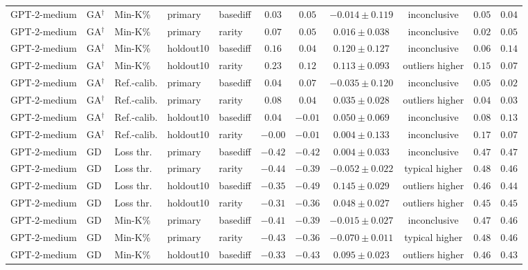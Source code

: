 \begin{table}[t]
\begin{tabular*}{\textwidth}{@{\extracolsep{\fill}}lllllcccccc@{}}
GPT-2-medium & GA$^{\dagger}$ & Min-K\% & primary & basediff & $0.03$ & $0.05$ & $-0.014 \pm 0.119$ & inconclusive & $0.05$ & $0.04$ \\
GPT-2-medium & GA$^{\dagger}$ & Min-K\% & primary & rarity & $0.07$ & $0.05$ & $0.016 \pm 0.038$ & inconclusive & $0.02$ & $0.05$ \\
GPT-2-medium & GA$^{\dagger}$ & Min-K\% & holdout10 & basediff & $0.16$ & $0.04$ & $0.120 \pm 0.127$ & inconclusive & $0.06$ & $0.14$ \\
GPT-2-medium & GA$^{\dagger}$ & Min-K\% & holdout10 & rarity & $0.23$ & $0.12$ & $0.113 \pm 0.093$ & outliers higher & $0.15$ & $0.07$ \\
GPT-2-medium & GA$^{\dagger}$ & Ref.-calib. & primary & basediff & $0.04$ & $0.07$ & $-0.035 \pm 0.120$ & inconclusive & $0.05$ & $0.02$ \\
GPT-2-medium & GA$^{\dagger}$ & Ref.-calib. & primary & rarity & $0.08$ & $0.04$ & $0.035 \pm 0.028$ & outliers higher & $0.04$ & $0.03$ \\
GPT-2-medium & GA$^{\dagger}$ & Ref.-calib. & holdout10 & basediff & $0.04$ & $-0.01$ & $0.050 \pm 0.069$ & inconclusive & $0.08$ & $0.13$ \\
GPT-2-medium & GA$^{\dagger}$ & Ref.-calib. & holdout10 & rarity & $-0.00$ & $-0.01$ & $0.004 \pm 0.133$ & inconclusive & $0.17$ & $0.07$ \\
GPT-2-medium & GD & Loss thr. & primary & basediff & $-0.42$ & $-0.42$ & $0.004 \pm 0.033$ & inconclusive & $0.47$ & $0.47$ \\
GPT-2-medium & GD & Loss thr. & primary & rarity & $-0.44$ & $-0.39$ & $-0.052 \pm 0.022$ & typical higher & $0.48$ & $0.46$ \\
GPT-2-medium & GD & Loss thr. & holdout10 & basediff & $-0.35$ & $-0.49$ & $0.145 \pm 0.029$ & outliers higher & $0.46$ & $0.44$ \\
GPT-2-medium & GD & Loss thr. & holdout10 & rarity & $-0.31$ & $-0.36$ & $0.048 \pm 0.027$ & outliers higher & $0.45$ & $0.45$ \\
GPT-2-medium & GD & Min-K\% & primary & basediff & $-0.41$ & $-0.39$ & $-0.015 \pm 0.027$ & inconclusive & $0.47$ & $0.46$ \\
GPT-2-medium & GD & Min-K\% & primary & rarity & $-0.43$ & $-0.36$ & $-0.070 \pm 0.011$ & typical higher & $0.48$ & $0.46$ \\
GPT-2-medium & GD & Min-K\% & holdout10 & basediff & $-0.33$ & $-0.43$ & $0.095 \pm 0.023$ & outliers higher & $0.46$ & $0.43$ \\

\end{tabular*}
\end{table}
